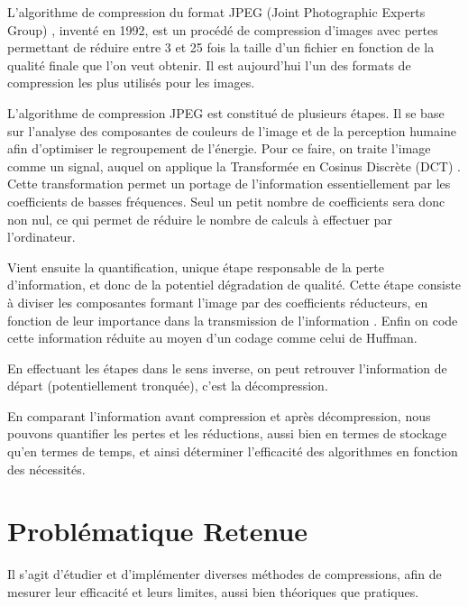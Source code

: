 \documentclass[a4paper, 11pt]{article}
\begin{document}
L'algorithme de compression du format JPEG (Joint Photographic Experts Group) \cite{jpeg}, inventé en 1992, est un procédé de compression d'images avec pertes permettant de réduire entre 3 et 25 fois la taille d'un fichier en fonction de la qualité finale que l'on veut obtenir. Il est aujourd'hui l'un des formats de compression les plus utilisés pour les images.

L'algorithme de compression JPEG est constitué de plusieurs étapes. Il se base sur l'analyse des composantes de couleurs de l'image et de la perception humaine afin d'optimiser le regroupement de l'énergie. Pour ce faire, on traite l'image comme un signal, auquel on applique la Transformée en Cosinus Discrète (DCT) \cite{jpeg}. Cette transformation permet un portage de l'information essentiellement par les coefficients de basses fréquences. Seul un petit nombre de coefficients sera donc non nul, ce qui permet de réduire le nombre de calculs à effectuer par l'ordinateur.

Vient ensuite la quantification, unique étape responsable de la perte d'information, et donc de la potentiel dégradation de qualité. Cette étape consiste à diviser les composantes formant l'image par des coefficients réducteurs, en fonction de leur importance dans la transmission de l'information \cite{code-theory} \cite{jpeg}. Enfin on code cette information \og réduite \fg au moyen d'un codage comme celui de Huffman.

En effectuant les étapes dans le sens inverse, on peut retrouver l'information de départ (potentiellement tronquée), c'est la décompression.

En comparant l'information avant compression et après décompression, nous pouvons quantifier les pertes et les réductions, aussi bien en termes de stockage qu'en termes de temps, et ainsi déterminer l'efficacité des algorithmes en fonction des nécessités.

\section*{Probl\'ematique Retenue}
Il s'agit d'étudier et d'implémenter diverses méthodes de compressions, afin de mesurer leur efficacité et leurs limites, aussi bien théoriques que pratiques.

\printbibliography[title=Références bibliographiques]
\end{document}
